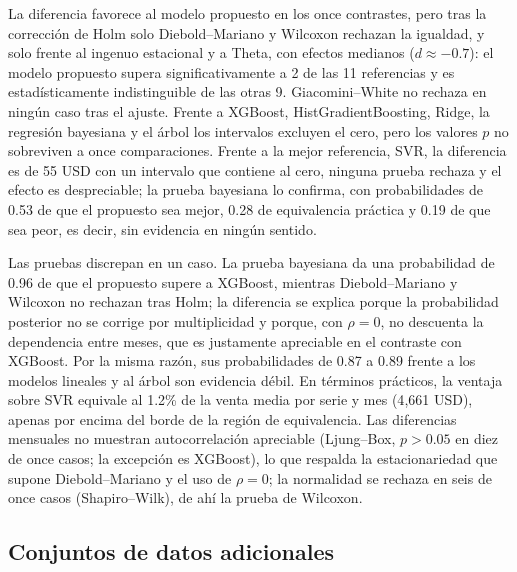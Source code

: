 \documentclass[pdflatex,sn-mathphys-num]{sn-jnl}
\theoremstyle{thmstyleone}
\begin{document}
La diferencia favorece al modelo propuesto en los once contrastes, pero tras la corrección de Holm solo Diebold--Mariano y Wilcoxon rechazan la igualdad, y solo frente al ingenuo estacional y a Theta, con efectos medianos ($d\approx-0.7$): el modelo propuesto supera significativamente a 2 de las 11 referencias y es estadísticamente indistinguible de las otras 9. Giacomini--White no rechaza en ningún caso tras el ajuste. Frente a XGBoost, HistGradientBoosting, Ridge, la regresión bayesiana y el árbol los intervalos excluyen el cero, pero los valores $p$ no sobreviven a once comparaciones. Frente a la mejor referencia, SVR, la diferencia es de 55 USD con un intervalo que contiene al cero, ninguna prueba rechaza y el efecto es despreciable; la prueba bayesiana lo confirma, con probabilidades de 0.53 de que el propuesto sea mejor, 0.28 de equivalencia práctica y 0.19 de que sea peor, es decir, sin evidencia en ningún sentido.

Las pruebas discrepan en un caso. La prueba bayesiana da una probabilidad de 0.96 de que el propuesto supere a XGBoost, mientras Diebold--Mariano y Wilcoxon no rechazan tras Holm; la diferencia se explica porque la probabilidad posterior no se corrige por multiplicidad y porque, con $\rho=0$, no descuenta la dependencia entre meses, que es justamente apreciable en el contraste con XGBoost. Por la misma razón, sus probabilidades de 0.87 a 0.89 frente a los modelos lineales y al árbol son evidencia débil. En términos prácticos, la ventaja sobre SVR equivale al 1.2\% de la venta media por serie y mes (4{,}661 USD), apenas por encima del borde de la región de equivalencia. Las diferencias mensuales no muestran autocorrelación apreciable (Ljung--Box, $p>0.05$ en diez de once casos; la excepción es XGBoost), lo que respalda la estacionariedad que supone Diebold--Mariano y el uso de $\rho=0$; la normalidad se rechaza en seis de once casos (Shapiro--Wilk), de ahí la prueba de Wilcoxon.

\subsection{Conjuntos de datos adicionales}\label{subsec:adicionales}
\end{document}
